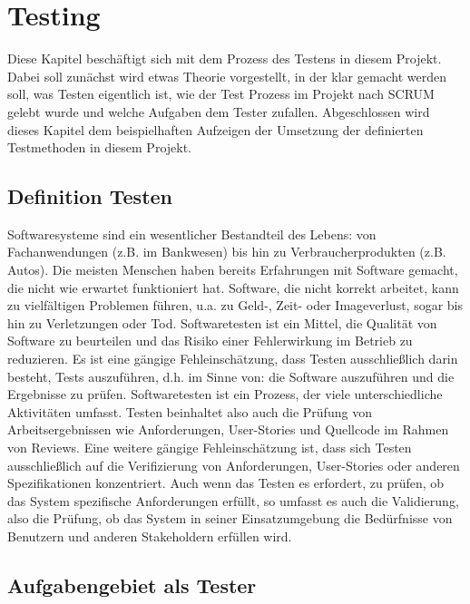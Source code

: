 \chapter{Testing}
\label{ch:testing}

Diese Kapitel beschäftigt sich mit dem Prozess des Testens in diesem Projekt. Dabei soll zunächst wird etwas Theorie vorgestellt, in der klar gemacht werden soll, was Testen eigentlich ist, wie der Test Prozess im Projekt nach SCRUM gelebt wurde und welche Aufgaben dem Tester zufallen. Abgeschlossen wird dieses Kapitel dem beispielhaften Aufzeigen der Umsetzung der definierten Testmethoden in diesem Projekt.

\section{Definition Testen}
\label{sec:DefTest}

Softwaresysteme sind ein wesentlicher Bestandteil des Lebens: von Fachanwendungen (z.B. im Bankwesen) bis hin zu Verbraucherprodukten (z.B. Autos). Die meisten Menschen haben bereits Erfahrungen mit Software gemacht, die nicht wie erwartet funktioniert hat. Software, die nicht korrekt arbeitet, kann zu vielfältigen Problemen führen, u.a. zu Geld-, Zeit- oder Imageverlust, sogar bis hin zu Verletzungen oder Tod.
Softwaretesten ist ein Mittel, die Qualität von Software zu beurteilen und das Risiko einer Fehlerwirkung im Betrieb zu reduzieren.
Es ist eine gängige Fehleinschätzung, dass Testen ausschließlich darin besteht, Tests auszuführen, d.h. im Sinne von: die Software auszuführen und die Ergebnisse zu prüfen. Softwaretesten ist ein Prozess, der viele unterschiedliche Aktivitäten umfasst. Testen beinhaltet also auch die Prüfung von Arbeitsergebnissen wie Anforderungen, User-Stories und Quellcode im Rahmen von Reviews. Eine weitere gängige Fehleinschätzung ist, dass sich Testen ausschließlich auf die Verifizierung von Anforderungen, User-Stories oder anderen Spezifikationen konzentriert. Auch wenn das Testen es erfordert, zu prüfen, ob das System spezifische Anforderungen erfüllt, so umfasst es auch die Validierung, also die Prüfung, ob das System in seiner Einsatzumgebung die Bedürfnisse von Benutzern und anderen Stakeholdern erfüllen wird.

\section{Aufgabengebiet als Tester}
\label{sec:AufgTest}

